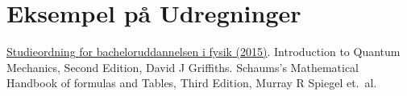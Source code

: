 \documentclass[danish,a4paper,oneside,onecolumn,article,11pt]{memoir}
\begin{document}
\chapter{Eksempel på Udregninger}

% 
% 
% 
% 
% 
% 

\begin{thebibliography}{99}
 \href{https://mit.au.dk/EDDI/webservices/DokOrdningService.cfc?method=visGodkendtOrdning&dokOrdningId=10727&sprog=da}{Studieordning for bacheloruddannelsen i fysik
  (2015)}.
 Introduction to Quantum Mechanics, Second Edition, David J Griffiths.
 Schaums's Mathematical Handbook of formulas and Tables, Third Edition, Murray R Spiegel et.~al.
\end{thebibliography}
\end{document}
